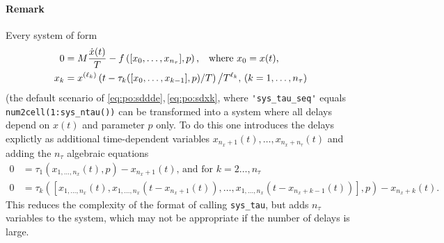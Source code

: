 \documentclass[11pt]{scrartcl}
\newcommand{\blist}[1]{\mbox{\lstinline!#1!}}
\begin{document}
\paragraph{Remark} Every system of form
\begin{align}
  \label{eq:po:sddde}
  0&=M\frac{\dot x(t)}{T}-f\left([x_0,\ldots,x_{n_\tau}],p\right)\mbox{,\quad where $x_0=x(t)$,}\\
    \label{eq:po:sdxk}
    x_k&=x^{(\ell_k)}\left(t-\tau_k([x_0,\ldots,x_{k-1}],p)/T\right)\big/T^{\ell_k}\mbox{,\ ($k=1,\ldots,n_\tau$)}
\end{align}
(the default scenario of
\eqref{eq:po:sddde},\,\eqref{eq:po:sdxk}, where \blist{'sys_tau_seq'}
equals \blist{num2cell(1:sys_ntau())} can be transformed into a
system where all delays depend on $x(t)$ and parameter $p$ only. To do this one
introduces the delays explictly as additional time-dependent
variables $x_{n_x+1}(t),\ldots,x_{n_x+n_\tau}(t)$ and adding the
$n_\tau$ algebraic equations
\begin{align}
  0&=\tau_1(x_{1,\ldots,n_x}(t),p)-x_{n_x+1}(t)\mbox{, and for $k=2\ldots,n_\tau$}\\
  0&=\tau_k([x_{1,\ldots,n_x}(t),x_{1,\ldots,n_x}(t-x_{n_x+1}(t)),\ldots,
  x_{1,\ldots,n_x}(t-x_{n_x+k-1}(t))],p)-x_{n_x+k}(t).
\end{align}
This reduces the complexity of the format of calling \blist{sys_tau},
but adds $n_\tau$ variables to the system, which may not be
appropriate if the number of delays is large.
\end{document}
